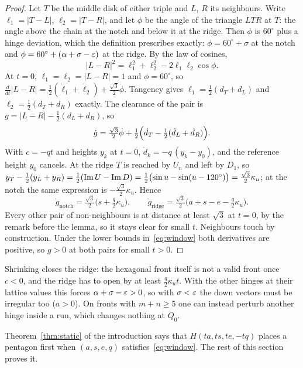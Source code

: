 \begin{proof}
Let $T$ be the middle disk of either triple and $L$, $R$ its neighbours. Write $\ell_1=|T-L|$,
$\ell_2=|T-R|$, and let $\phi$ be the angle of the triangle $LTR$ at $T$: the angle above the chain at the
notch and below it at the ridge. Then $\phi$ is $60^\circ$ plus a hinge deviation, which the
definition prescribes exactly: $\phi=60^\circ+\sigma$ at the notch and $\phi=60^\circ+(\alpha+\sigma-\varepsilon)$ at the
ridge. By the law of cosines,
\[
|L-R|^2=\ell_1^2+\ell_2^2-2\ell_1\ell_2\cos\phi .
\]
At $t=0$, $\ell_1=\ell_2=|L-R|=1$ and $\phi=60^\circ$, so
$\tfrac{d}{dt}|L-R|=\tfrac12(\dot\ell_1+\dot\ell_2)+\tfrac{\sqrt3}2\dot\phi$. Tangency gives
$\ell_1=\tfrac12(d_T+d_L)$ and $\ell_2=\tfrac12(d_T+d_R)$ exactly. The clearance of the pair is
$g=|L-R|-\tfrac12(d_L+d_R)$, so
\[
\dot g=\tfrac{\sqrt3}2\dot\phi+\tfrac12\Bigl(\dot d_T-\tfrac12(\dot d_L+\dot d_R)\Bigr).
\]
With $c=-qt$ and heights $y_k$ at $t=0$, $\dot d_k=-q\,(y_k-y_0)$, and the reference height $y_0$ cancels.
At the ridge $T$ is reached by $U_n$ and left by $D_1$, so
$y_T-\tfrac12(y_L+y_R)=\tfrac12(\operatorname{Im} U-\operatorname{Im} D)=\tfrac12\bigl(\sin u-\sin(u-120^\circ)\bigr)=\tfrac{\sqrt3}2\kappa_u$; at the
notch the same expression is $-\tfrac{\sqrt3}2\kappa_u$. Hence
\[
\dot g_{\mathrm{notch}}=\tfrac{\sqrt3}2\bigl(s+\tfrac q2\kappa_u\bigr),\qquad
\dot g_{\mathrm{ridge}}=\tfrac{\sqrt3}2\bigl(a+s-e-\tfrac q2\kappa_u\bigr).
\]
Every other pair of non-neighbours is at distance at least $\sqrt3$ at $t=0$, by the remark before the
lemma, so it stays clear for small $t$. Neighbours touch by construction. Under the lower bounds
in~\eqref{eq:window} both derivatives are positive, so $g>0$ at both pairs for small $t>0$.
\end{proof}

\noindent Shrinking closes the ridge: the hexagonal front itself is not a valid front once $c<0$, and the
ridge has to open by at least $\tfrac q2\kappa_u t$. With the other hinges at their lattice values this forces
$\alpha+\sigma-\varepsilon>0$, so with $\sigma<\varepsilon$ the down vectors must be irregular too ($a>0$). On fronts with
$m+n\ge5$ one can instead perturb another hinge inside a run, which changes nothing at $Q_0$.

Theorem~\ref{thm:static} of the introduction says that $H(ta,ts,te,-tq)$ places a pentagon first when
$(a,s,e,q)$ satisfies~\eqref{eq:window}. The rest of this section proves it.

